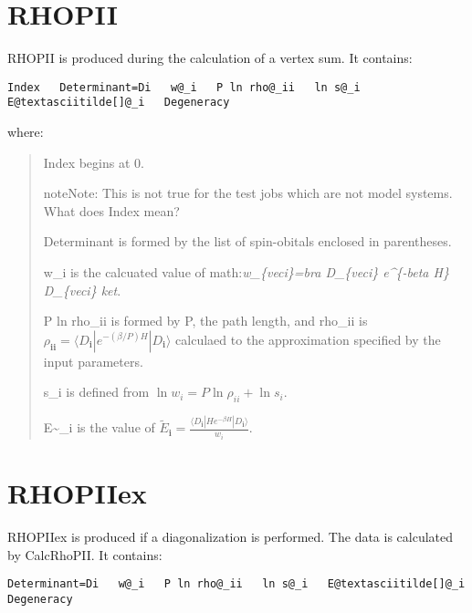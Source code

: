 \documentclass[openany,a4paper,10pt,english]{manual}
\newcommand{\bra}{\ensuremath{\langle}}
\newcommand{\ket}{\ensuremath{\rangle}}
\newcommand{\veci}{\ensuremath{\mathbf{i}}}
\begin{document}
\resetcurrentobjects
\hypertarget{--doc-output/rhopii}{}

\hypertarget{output-rhopii}{}\section{RHOPII}

RHOPII is produced during the calculation of a vertex sum.  It contains:

\begin{Verbatim}[commandchars=@\[\]]
Index   Determinant=Di   w@_i   P ln rho@_ii   ln s@_i   E@textasciitilde[]@_i   Degeneracy
\end{Verbatim}

where:
\begin{quote}

Index begins at 0.

\begin{notice}{note}{Note:}
This is not true for the test jobs which are not model systems.  What does Index mean?
\end{notice}

Determinant is formed by the list of spin-obitals enclosed in parentheses.

w\_i is the calcuated value of math:\emph{w\_\{veci\}=bra D\_\{veci\} \textbar{} e\textasciicircum{}\{-beta H\} \textbar{} D\_\{veci\} ket}.

P ln rho\_ii is formed by P, the path length, and rho\_ii is
$\rho_{\veci\veci}=\bra D_{\veci} | e^{-(\beta/P) H} | D_{\veci} \ket$
calculaed to the approximation specified by the input parameters.

s\_i is defined from $\operatorname{ln} w_i = P \operatorname{ln} \rho_{ii} + \operatorname{ln} s_i$.

E\textasciitilde{}\_i is the value of $\tilde{E}_{\veci}=\frac{\bra D_{\veci} | H e^{-\beta H} | D_{\veci} \ket}{w_i}$.
\end{quote}

\resetcurrentobjects
\hypertarget{--doc-output/rhopiiex}{}

\hypertarget{output-rhopiiex}{}\section{RHOPIIex}

RHOPIIex is produced if a diagonalization is performed. The data is calculated
by CalcRhoPII.  It contains:

\begin{Verbatim}[commandchars=@\[\]]
Determinant=Di   w@_i   P ln rho@_ii   ln s@_i   E@textasciitilde[]@_i   Degeneracy
\end{Verbatim}
\end{document}

